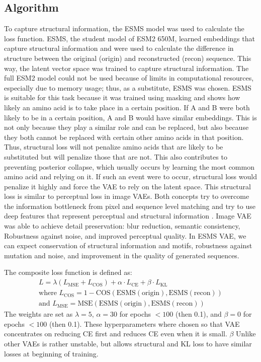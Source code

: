 \documentclass[numsec,webpdf,contemporary,medium]{oup-authoring-template}
\begin{document}
\subsection{Algorithm}\label{subsec:loss_arch}
To capture structural information, the ESMS model was used to calculate the loss function. ESMS, the student model of ESM2 650M, learned embeddings that capture structural information and were used to calculate the difference in structure between the original (origin) and reconstructed (recon) sequence. This way, the latent vector space was trained to capture structural information. The full ESM2 model could not be used because of limits in computational resources, especially due to memory usage; thus, as a substitute, ESMS was chosen.
ESMS is suitable for this task because it was trained using masking and shows how likely an amino acid is to take place in a certain position. If A and B were both likely to be in a certain position, A and B would have similar embeddings. This is not only because they play a similar role and can be replaced, but also because they both cannot be replaced with certain other amino acids in that position. Thus, structural loss will not penalize amino acids that are likely to be substituted but will penalize those that are not. This also contributes to preventing posterior collapse, which usually occurs by learning the most common amino acid and relying on it. If such an event were to occur, structural loss would penalize it highly and force the VAE to rely on the latent space. This structural loss is similar to perceptual loss in image VAEs. Both concepts try to overcome the information bottleneck from pixel and sequence level matching and try to use deep features that represent perceptual and structural information \citep{johnson2016perceptual}. Image VAE was able to achieve detail preservation: blur reduction, semantic consistency, Robustness against noise, and improved perceptual quality. In ESMS VAE, we can expect conservation of structural information and motifs, robustness against mutation and noise, and improvement in the quality of generated sequences.

The composite loss function is defined as:
\begin{gather}
L = \lambda (L_{\text{MSE}} + L_{\text{COS}}) + \alpha \cdot L_{\text{CE}} + \beta \cdot L_{\text{KL}} \\
\text{where } L_{\text{COS}} = 1 - \text{COS}(\text{ESMS}(\text{origin}), \text{ESMS}(\text{recon})) \nonumber \\
\text{and } L_{\text{MSE}} = \text{MSE}(\text{ESMS}(\text{origin}), \text{ESMS}(\text{recon})) \nonumber
\end{gather}
The weights are set as $\lambda=5$, $\alpha=30$ for epochs $< 100$ (then 0.1), and $\beta=0$ for epochs $< 100$ (then 0.1). These hyperparameters where chosen so that VAE concentrates on reducing CE first and reduces CE even when it is small. $\beta$ Unlike other VAEs is rather unstable, but allows structural and KL loss to have similar losses at beginning of training.
\end{document}
